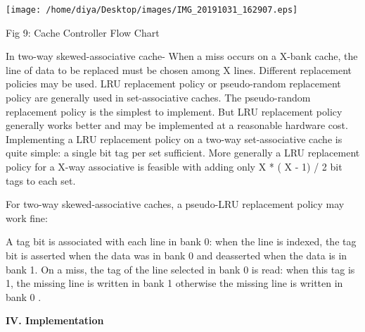 \documentclass [ 12pt, letterpaper, twoside] {article}
\begin{document}
\texttt{[image: /home/diya/Desktop/images/IMG\_20191031\_162907.eps]}

Fig 9: Cache Controller Flow Chart

In two-way skewed-associative cache-
When a miss occurs on a X-bank cache, the line of data to be replaced must be chosen among X lines. Different replacement policies may be used. LRU replacement policy or pseudo-random replacement policy are generally used in set-associative caches.
The pseudo-random replacement policy is the simplest to implement. But LRU replacement policy
generally works better and may be implemented at a reasonable hardware cost. Implementing a LRU replacement policy on a two-way set-associative cache is quite simple: a single bit tag per set sufficient.
More generally a LRU replacement policy for a X-way associative is feasible with adding only X * ( X - 1) / 2 bit tags to each set.

For two-way skewed-associative caches, a pseudo-LRU replacement policy may work fine:

A tag bit is associated with each line in bank 0: when the line is indexed, the tag bit is asserted
when the data was in bank 0 and deasserted when the data is in bank 1.
On a miss, the tag of the line selected in bank 0 is read: when this tag is 1, the missing line is
written in bank 1 otherwise the missing line is written in bank 0 .

\textbf{\large IV. Implementation}
\end{document}

